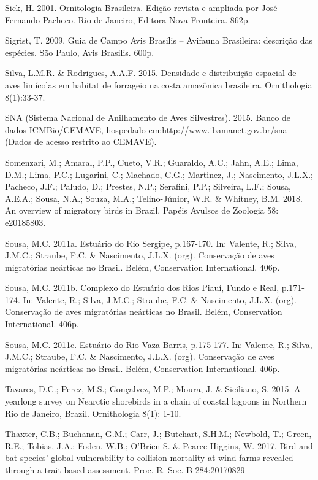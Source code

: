 \documentclass[
]{scrbook}
\begin{document}
Sick, H. 2001. Ornitologia Brasileira. Edição revista e ampliada por José Fernando Pacheco. Rio de Janeiro, Editora Nova Fronteira. 862p.

Sigrist, T. 2009. Guia de Campo Avis Brasilis -- Avifauna Brasileira: descrição das espécies. São Paulo, Avis Brasilis. 600p.

Silva, L.M.R. \& Rodrigues, A.A.F. 2015. Densidade e distribuição espacial de aves limícolas em habitat de forrageio na costa amazônica brasileira. Ornithologia 8(1):33-37.

SNA (Sistema Nacional de Anilhamento de Aves Silvestres). 2015. Banco de dados ICMBio/CEMAVE, hospedado em:\url{http://www.ibamanet.gov.br/sna} (Dados de acesso restrito ao CEMAVE).

Somenzari, M.; Amaral, P.P., Cueto, V.R.; Guaraldo, A.C.; Jahn, A.E.; Lima, D.M.; Lima, P.C.; Lugarini, C.; Machado, C.G.; Martinez, J.; Nascimento, J.L.X.; Pacheco, J.F.; Paludo, D.; Prestes, N.P.; Serafini, P.P.; Silveira, L.F.; Sousa, A.E.A.; Sousa, N.A.; Souza, M.A.; Telino-Júnior, W.R. \& Whitney, B.M. 2018. An overview of migratory birds in Brazil. Papéis Avulsos de Zoologia 58: e20185803.

Sousa, M.C. 2011a. Estuário do Rio Sergipe, p.167-170. In: Valente, R.; Silva, J.M.C.; Straube, F.C. \& Nascimento, J.L.X. (org). Conservação de aves migratórias neárticas no Brasil. Belém, Conservation International. 406p.

Sousa, M.C. 2011b. Complexo do Estuário dos Rios Piauí, Fundo e Real, p.171-174. In: Valente, R.; Silva, J.M.C.; Straube, F.C. \& Nascimento, J.L.X. (org). Conservação de aves migratórias neárticas no Brasil. Belém, Conservation International. 406p.

Sousa, M.C. 2011c. Estuário do Rio Vaza Barris, p.175-177. In: Valente, R.; Silva, J.M.C.; Straube, F.C. \& Nascimento, J.L.X. (org). Conservação de aves migratórias neárticas no Brasil. Belém, Conservation International. 406p.

Tavares, D.C.; Perez, M.S.; Gonçalvez, M.P.; Moura, J. \& Siciliano, S. 2015. A yearlong survey on Nearctic shorebirds in a chain of coastal lagoons in Northern Rio de Janeiro, Brazil. Ornithologia 8(1): 1-10.

Thaxter, C.B.; Buchanan, G.M.; Carr, J.; Butchart, S.H.M.; Newbold, T.; Green, R.E.; Tobias, J.A.; Foden, W.B.; O'Brien S. \& Pearce-Higgins, W. 2017. Bird and bat species' global vulnerability to collision mortality at wind farms revealed through a trait-based assessment. Proc. R. Soc. B 284:20170829
\end{document}
